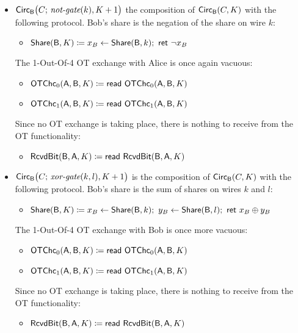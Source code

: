\begin{itemize}
\item $\mathsf{Circ}_{\mathsf{B}}\big(C; \, \textit{not-gate}(k),K+1\big)$ the composition of $\mathsf{Circ}_{\mathsf{B}}(C,K)$ with the following protocol. Bob’s share is the negation of the share on wire $k$:
\begin{itemize}
\item $\mathsf{Share}(\mathsf{B},K) \coloneqq x_B \leftarrow \mathsf{Share}(\mathsf{B},k); \ \mathsf{ret} \ \neg x_B$
\end{itemize}
The 1-Out-Of-4 OT exchange with Alice is once again vacuous:
\begin{itemize}
\item $\mathsf{OTChc}_0(\mathsf{A},\mathsf{B},K) \coloneqq \mathsf{read} \ \mathsf{OTChc}_0(\mathsf{A},\mathsf{B},K)$
\item $\mathsf{OTChc}_1(\mathsf{A},\mathsf{B},K) \coloneqq \mathsf{read} \ \mathsf{OTChc}_1(\mathsf{A},\mathsf{B},K)$
\end{itemize}
Since no OT exchange is taking place, there is nothing to receive from the OT functionality:
\begin{itemize}
\item $\mathsf{RcvdBit}(\mathsf{B},\mathsf{A},K) \coloneqq \mathsf{read} \ \mathsf{RcvdBit}(\mathsf{B},\mathsf{A},K)$
\end{itemize}

\item $\mathsf{Circ}_{\mathsf{B}}\big(C; \, \textit{xor-gate}(k,l),K+1\big)$ is the composition of $\mathsf{Circ}_{\mathsf{B}}(C,K)$ with the following protocol. Bob’s share is the sum of shares on wires $k$ and $l$:
\begin{itemize}
\item $\mathsf{Share}(\mathsf{B},K) \coloneqq x_B \leftarrow \mathsf{Share}(\mathsf{B},k); \ y_B \leftarrow \mathsf{Share}(\mathsf{B},l); \ \mathsf{ret} \ x_B \oplus y_B$
\end{itemize}
The 1-Out-Of-4 OT exchange with Bob is once more vacuous:
\begin{itemize}
\item $\mathsf{OTChc}_0(\mathsf{A},\mathsf{B},K) \coloneqq \mathsf{read} \ \mathsf{OTChc}_0(\mathsf{A},\mathsf{B},K)$
\item $\mathsf{OTChc}_1(\mathsf{A},\mathsf{B},K) \coloneqq \mathsf{read} \ \mathsf{OTChc}_1(\mathsf{A},\mathsf{B},K)$
\end{itemize}
Since no OT exchange is taking place, there is nothing to receive from the OT functionality:
\begin{itemize}
\item $\mathsf{RcvdBit}(\mathsf{B},\mathsf{A},K) \coloneqq \mathsf{read} \ \mathsf{RcvdBit}(\mathsf{B},\mathsf{A},K)$
\end{itemize}


\end{itemize}
